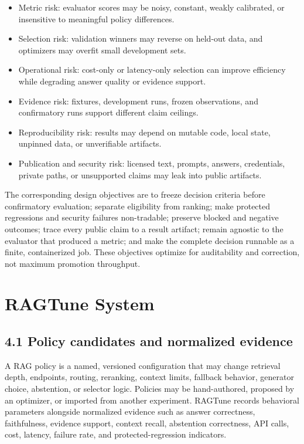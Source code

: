 \documentclass[11pt]{article}
\begin{document}
\begin{itemize}[leftmargin=*]
\item Metric risk: evaluator scores may be noisy, constant, weakly calibrated, or insensitive to meaningful policy differences.
\item Selection risk: validation winners may reverse on held-out data, and optimizers may overfit small development sets.
\item Operational risk: cost-only or latency-only selection can improve efficiency while degrading answer quality or evidence support.
\item Evidence risk: fixtures, development runs, frozen observations, and confirmatory runs support different claim ceilings.
\item Reproducibility risk: results may depend on mutable code, local state, unpinned data, or unverifiable artifacts.
\item Publication and security risk: licensed text, prompts, answers, credentials, private paths, or unsupported claims may leak into public artifacts.
\end{itemize}
The corresponding design objectives are to freeze decision criteria before confirmatory evaluation; separate eligibility from ranking; make protected regressions and security failures non-tradable; preserve blocked and negative outcomes; trace every public claim to a result artifact; remain agnostic to the evaluator that produced a metric; and make the complete decision runnable as a finite, containerized job. These objectives optimize for auditability and correction, not maximum promotion throughput.

\section{RAGTune System}
\subsection{4.1 Policy candidates and normalized evidence}
A RAG policy is a named, versioned configuration that may change retrieval depth, endpoints, routing, reranking, context limits, fallback behavior, generator choice, abstention, or selector logic. Policies may be hand-authored, proposed by an optimizer, or imported from another experiment. RAGTune records behavioral parameters alongside normalized evidence such as answer correctness, faithfulness, evidence support, context recall, abstention correctness, API calls, cost, latency, failure rate, and protected-regression indicators.
\end{document}
